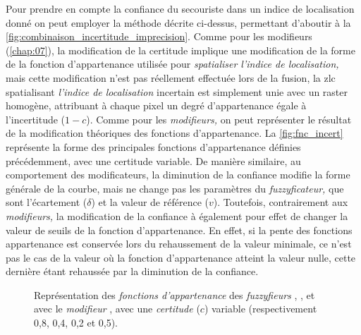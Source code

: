Pour prendre en compte la confiance du secouriste dans un indice de
localisation donné on peut employer la méthode décrite ci-dessus,
permettant d'aboutir à la
\autoref{fig:combinaison_incertitude_imprecision}. Comme pour les
modifieurs (\autoref{chap:07}), la modification de la certitude
implique une modification de la forme de la fonction d'appartenance
utilisée pour \emph{spatialiser l'indice de localisation,} mais cette
modification n'est pas réellement effectuée lors de la fusion, la
\ac{zlc} spatialisant \emph{l'indice de localisation} incertain est
simplement unie avec un raster homogène, attribuant à chaque pixel un
degré d'appartenance égale à l'incertitude (\(1-c\)). Comme pour les
\emph{modifieurs,} on peut représenter le résultat de la modification
théoriques des fonctions d'appartenance. La \autoref{fig:fnc_incert}
représente la forme des principales fonctions d'appartenance définies
précédemment, avec une certitude variable. De manière similaire, au
comportement des modificateurs, la diminution de la confiance modifie
la forme générale de la courbe, mais ne change pas les paramètres du
\emph{fuzzyficateur,} que sont l'écartement (\(\delta\)) et la valeur
de référence (\(v\)). Toutefois, contrairement aux \emph{modifieurs,}
la modification de la confiance à également pour effet de changer la
valeur de seuils de la fonction d'appartenance. En effet, si la pente
des fonctions appartenance est conservée lors du rehaussement de la
valeur minimale, ce n'est pas le cas de la valeur où la fonction
d'appartenance atteint la valeur nulle, cette dernière étant rehaussée
par la diminution de la confiance.

\begin{figure}
  \centering  \subfloat[\label{fig:fnc_app_inc}]{}\hfill
  \subfloat[\label{fig:fnc_app_inc_2}]{}

  \subfloat[\label{fig:fnc_app_inc_3}]{}\hfill
  \subfloat[\label{fig:fnc_app_inc_4}]{}
  \caption[Représentation des \emph{fonctions d'appartenance} de
  différents \emph{fuzzyfieurs} avec une
  \emph{incertitude}]{Représentation des \emph{fonctions
      d'appartenance} des \emph{fuzzyfieurs}
    \protect{} \protect{},
    \protect{} \protect{},
    \protect{} \protect{}
    et \protect{} avec le \emph{modifieur}
    \protect{} \protect{}, avec
    une \emph{certitude} (\(c\)) variable (respectivement 0,8, 0,4,
    0,2 et 0,5).}
  \label{fig:fnc_incert}
\end{figure}

